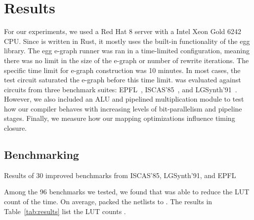 \section{Results}\label{sec:results}
For our experiments, we used a Red Hat 8 server with a Intel Xeon Gold 6242
CPU. Since \shortname{} is written in Rust, it mostly uses the built-in
functionality of the egg library. The egg e-graph runner was ran in a
time-limited configuration, meaning there was no limit in the size of the
e-graph or number of rewrite iterations. The specific time limit for e-graph
construction was 10 minutes. In most cases, the test circuit saturated the
e-graph before this time limit. \shortname{} was evaluated against circuits
from three benchmark suites: EPFL~\cite{epflbench}, ISCAS'85~\cite{iscasbench},
and LGSynth'91~\cite{lgsynthbench}. However, we also included an ALU and
pipelined multiplication module to test how our compiler behaves with
increasing levels of bit-parallelism and pipeline stages. Finally, we measure
how our mapping optimizations influence timing closure.

\subsection{Benchmarking}\label{sec:results:benchmark}
\begin{table}
    \centering
    \caption{Results of 30 improved benchmarks from ISCAS'85, LGSynth'91, and EPFL}\label{tab:results}
\end{table}
Among the 96 benchmarks we tested, we found that \shortname{} was able to
reduce the LUT count \fmetric{} of the time. On average, \shortname{} packed the
netlists to \metric{}. The results in Table~\ref{tab:results} list the LUT counts .

